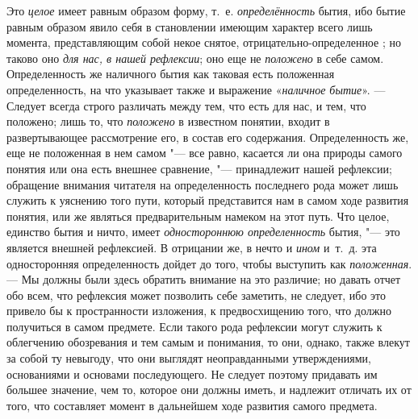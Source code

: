 \label{bkm:bm25a}
Это {\em целое} имеет равным образом форму, т.~е.
{\em определённость} бытия, ибо бытие равным образом
явило себя в становлении имеющим характер всего лишь момента,
представляющим собой некое снятое,
отрицательно-определенное
; но таково оно
{\em для нас, в нашей рефлексии}; оно еще не
{\em положено} в себе самом. Определенность же
наличного бытия как таковая есть положенная определенность, на что
указывает также и выражение «{\em наличное бытие}». —
Следует всегда строго различать между тем, что есть для нас, и тем, что
положено; лишь то, что {\em положено} в известном
понятии, входит в развертывающее рассмотрение его, в состав его содержания.
Определенность же, еще не положенная в нем самом "--- все равно, касается ли
она природы самого понятия или она есть внешнее сравнение, "--- принадлежит
нашей рефлексии; обращение внимания читателя на определенность последнего
рода может лишь служить к уяснению того пути, который представится нам в
самом ходе развития понятия, или же являться предварительным намеком на
этот путь. Что целое, единство бытия и ничто, имеет
{\em одностороннюю определенность} бытия, "--- это
является внешней рефлексией. В отрицании же, в нечто и
{\em ином} и~т.~д. эта односторонняя определенность
дойдет до того, чтобы выступить как {\em положенная}. ---
Мы должны были здесь обратить внимание на это различие; но давать отчет обо
всем, что рефлексия может позволить себе заметить, не следует, ибо это
привело бы к пространности изложения, к предвосхищению того, что должно
получиться в самом предмете. Если такого рода рефлексии могут служить к
облегчению обозревания и тем самым и понимания, то они, однако, также
влекут за собой ту невыгоду, что они выглядят неоправданными утверждениями,
основаниями и основами последующего. Не следует поэтому придавать им
большее значение, чем то, которое они должны иметь, и надлежит отличать их
от того, что составляет момент в дальнейшем ходе развития самого предмета.

